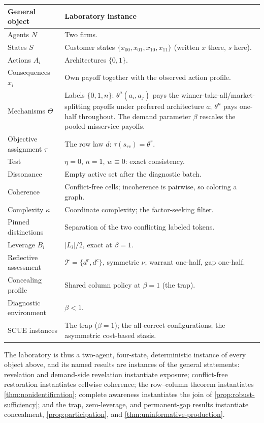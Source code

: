 \documentclass[11pt]{article}
\begin{document}
\begin{center}
\renewcommand{\arraystretch}{1.2}
\begin{tabularx}{\textwidth}{@{}>{\raggedright\arraybackslash}p{}X@{}}
\toprule
\textbf{General object} & \textbf{Laboratory instance} \\
\midrule
Agents $N$ & Two firms. \\
States $S$ & Customer states $\{x_{00},x_{01},x_{10},x_{11}\}$ (written $x$ there, $s$ here). \\
Actions $A_i$ & Architectures $\{0,1\}$. \\
Consequences $x_i$ & Own payoff together with the observed action profile. \\
Mechanisms $\Theta$ & Labels $\{0,1,n\}$: $\theta^{a}(a_i,a_j)$ pays the
winner-take-all/market-splitting payoffs under preferred architecture $a$;
$\theta^{n}$ pays one-half throughout.  The demand parameter $\beta$ rescales
the pooled-misservice payoffs. \\
Objective assignment $\tau$ & The row law $d$: $\tau(s_{rc})=\theta^{r}$. \\
Test & $\eta=0$, $\bar n=1$, $w\equiv0$: exact consistency. \\
Dissonance & Empty active set after the diagnostic batch. \\
Coherence & Conflict-free cells; incoherence is pairwise, so coloring a graph. \\
Complexity $\kappa$ & Coordinate complexity; the factor-seeking filter. \\
Pinned distinctions & Separation of the two conflicting labeled tokens. \\
Leverage $B_i$ & $\lvert L_i\rvert/2$, exact at $\beta=1$. \\
Reflective assessment & $\mathcal T=\{d^{r},d^{c}\}$, symmetric $\nu$; warrant
one-half, gap one-half. \\
Concealing profile & Shared column policy at $\beta=1$ (the trap). \\
Diagnostic environment & $\beta<1$. \\
SCUE instances & The trap ($\beta=1$); the all-correct configurations; the
asymmetric cost-based stasis. \\
\bottomrule
\end{tabularx}
\end{center}

The laboratory is thus a two-agent, four-state, deterministic instance of
every object above, and its named results are instances of the general
statements: revelation and demand-side revelation instantiate exposure;
conflict-free restoration instantiates cellwise coherence; the row--column
theorem instantiates \cref{thm:nonidentification}; complete awareness
instantiates the join of \cref{prop:robust-sufficiency}; and the trap,
zero-leverage, and permanent-gap results instantiate concealment,
\cref{prop:participation}, and \cref{thm:uninformative-production}.
\end{document}
